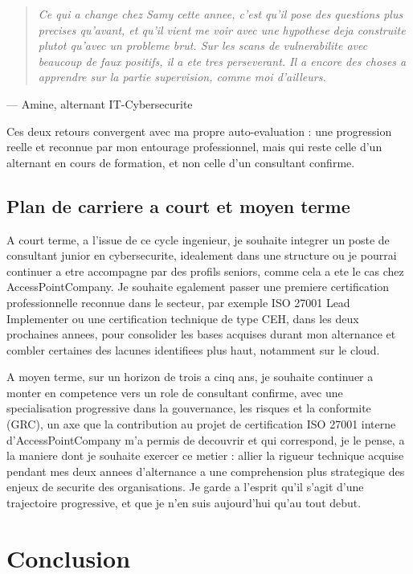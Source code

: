 \documentclass[11pt,a4paper]{article}
\newcommand{\citationperso}[2]{%
\par\smallskip\noindent\begin{quote}\itshape #1\end{quote}
\hfill --- #2\par\smallskip
}
\begin{document}
\citationperso{Ce qui a change chez Samy cette annee, c'est qu'il pose des questions plus precises qu'avant, et qu'il vient me voir avec une hypothese deja construite plutot qu'avec un probleme brut. Sur les scans de vulnerabilite avec beaucoup de faux positifs, il a ete tres perseverant. Il a encore des choses a apprendre sur la partie supervision, comme moi d'ailleurs.}{Amine, alternant IT-Cybersecurite}

Ces deux retours convergent avec ma propre auto-evaluation : une progression reelle et reconnue par mon entourage professionnel, mais qui reste celle d'un alternant en cours de formation, et non celle d'un consultant confirme.

\subsection{Plan de carriere a court et moyen terme}

A court terme, a l'issue de ce cycle ingenieur, je souhaite integrer un poste de consultant junior en cybersecurite, idealement dans une structure ou je pourrai continuer a etre accompagne par des profils seniors, comme cela a ete le cas chez AccessPointCompany. Je souhaite egalement passer une premiere certification professionnelle reconnue dans le secteur, par exemple ISO 27001 Lead Implementer ou une certification technique de type CEH, dans les deux prochaines annees, pour consolider les bases acquises durant mon alternance et combler certaines des lacunes identifiees plus haut, notamment sur le cloud.

A moyen terme, sur un horizon de trois a cinq ans, je souhaite continuer a monter en competence vers un role de consultant confirme, avec une specialisation progressive dans la gouvernance, les risques et la conformite (GRC), un axe que la contribution au projet de certification ISO 27001 interne d'AccessPointCompany m'a permis de decouvrir et qui correspond, je le pense, a la maniere dont je souhaite exercer ce metier : allier la rigueur technique acquise pendant mes deux annees d'alternance a une comprehension plus strategique des enjeux de securite des organisations. Je garde a l'esprit qu'il s'agit d'une trajectoire progressive, et que je n'en suis aujourd'hui qu'au tout debut.

\section*{Conclusion}
\end{document}
